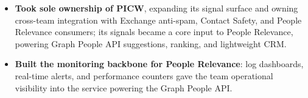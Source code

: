 \documentclass{resume-v2}
\begin{document}
\begin{itemize}
  \item \textbf{Took sole ownership of PICW}, expanding its signal surface and owning cross-team integration with Exchange anti\mbox{-}spam, Contact Safety, and People Relevance consumers; its signals became a core input to People Relevance, powering Graph People API suggestions, ranking, and lightweight CRM.
  \item \textbf{Built the monitoring backbone for People Relevance}: log dashboards, real-time alerts, and performance counters gave the team operational visibility into the service powering the Graph People API.

\end{itemize}
\end{document}
